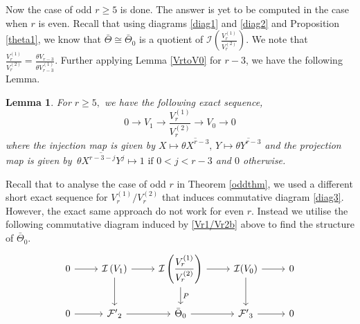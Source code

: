 \documentclass[11pt, reqno]{amsart}
\numberwithin{equation}{section}
\newtheorem{lemma}[thm]{Lemma}
\theoremstyle{definition}
\theoremstyle{remark}
\theoremstyle{definition}
\theoremstyle{remark}
\theoremstyle{remark}
\begin{document}
Now the case of odd $r\geq 5$ is done. The answer is yet to be computed in the case when $r$ is even. Recall that using diagrams \eqref{diag1} and \eqref{diag2} and Proposition \ref{theta1}, we know that $\bar{\Theta}\cong \bar{\Theta}_{0}$ is a quotient of $\mathcal{I}\left(\frac{V_{r}^{(1)}}{V_{r}^{(2)}}\right)$. We note that $\frac{V_{r}^{(1)}}{V_{r}^{(2)}}= \frac{\theta V_{r-3}}{\theta V_{r-3}^{(1)}}$. %
 Further applying Lemma \ref{VrtoV0} for $r-3$, we have the following Lemma. 
\begin{lemma}\label{Vr1/Vr2}
 For $r\geq5,$  we have the following exact sequence,
 \begin{equation}\label{Vr1/Vr2b}
 0 \to V_{1} \to \frac{V_r^{(1)}}{V_{r}^{(2)}} \to V_{0} \to 0
 \end{equation} 
 where the injection map is given by 
    $ X \longmapsto \overline{\theta X^{r-3}},\,
    Y \longmapsto \overline{\theta Y^{r-3}} $
  and the projection map  is given by $\,
     \overline{ \theta X^{r-3-j}Y^j}\longmapsto 1 \text{ if } 0<j<r-3$ and $0$ otherwise.
\end{lemma}
 Recall that to analyse the case of odd $r$ in Theorem \ref{oddthm},  we used a different short exact sequence for $V_r^{(1)}/V_r^{(2)}$ that induces commutative diagram \eqref{diag3}. However, the exact same  approach do not work for even $r$. Instead we  utilise the following commutative diagram induced by \eqref{Vr1/Vr2b} above to find the structure of  $\bar{\Theta}_{0}$. 
\begin{equation}\label{diag4}
\begin{tikzcd}
 		0 \arrow[r] & \mathcal{I}\left(V_{1}\right) \arrow[d, ""]\arrow[r] & \mathcal{I}\left(\dfrac{V_{r}^{(1)}}{V_{r}^{(2)}}\right)  \arrow[r] \arrow[d, "P"] & \mathcal{I}(V_{0}) \arrow [r] \arrow[d, ""]& 0\\
 		0 \arrow[r] &\mathcal{F'}_{2}  \arrow[r] & \bar{\Theta}_{0} \arrow[r] & \mathcal{F'}_{3}\arrow[r] & 0
 \end{tikzcd}
\end{equation}
\end{document}
